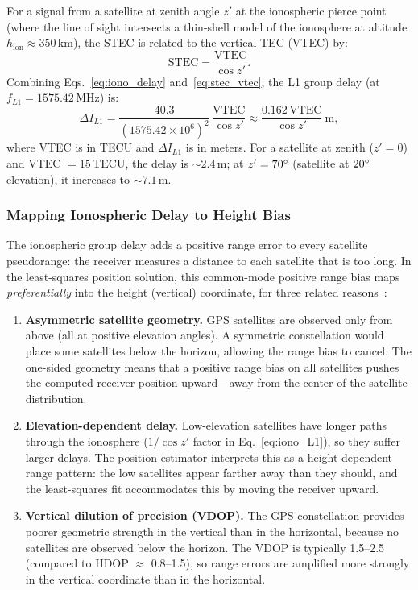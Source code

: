 For a signal from a satellite at zenith angle $z'$ at the ionospheric pierce point (where the line of sight intersects a thin-shell model of the ionosphere at altitude $h_{\text{ion}} \approx 350$\,km), the STEC is related to the vertical TEC (VTEC) by:
\begin{equation}
\text{STEC} = \frac{\text{VTEC}}{\cos z'}.
\label{eq:stec_vtec}
\end{equation}
Combining Eqs.~\eqref{eq:iono_delay} and~\eqref{eq:stec_vtec}, the L1 group delay (at $f_{L1} = 1575.42$\,MHz) is:
\begin{equation}
\Delta I_{L1} = \frac{40.3}{(1575.42 \times 10^6)^2}\,\frac{\text{VTEC}}{\cos z'} \approx \frac{0.162\,\text{VTEC}}{\cos z'}~\text{m},
\label{eq:iono_L1}
\end{equation}
where VTEC is in TECU and $\Delta I_{L1}$ is in meters. For a satellite at zenith ($z' = 0$) and VTEC $= 15$\,TECU, the delay is $\sim\!2.4$\,m; at $z' = 70^\circ$ (satellite at $20^\circ$ elevation), it increases to $\sim\!7.1$\,m.

\subsubsection{Mapping Ionospheric Delay to Height Bias}
\label{sec:iono_height}

The ionospheric group delay adds a positive range error to every satellite pseudorange: the receiver measures a distance to each satellite that is too long. In the least-squares position solution, this common-mode positive range bias maps \emph{preferentially} into the height (vertical) coordinate, for three related reasons~\cite{coster2008,ovstedal2002}:

\begin{enumerate}[nosep]
\item \textbf{Asymmetric satellite geometry.} GPS satellites are observed only from above (all at positive elevation angles). A symmetric constellation would place some satellites below the horizon, allowing the range bias to cancel. The one-sided geometry means that a positive range bias on all satellites pushes the computed receiver position upward---away from the center of the satellite distribution.

\item \textbf{Elevation-dependent delay.} Low-elevation satellites have longer paths through the ionosphere ($1/\cos z'$ factor in Eq.~\ref{eq:iono_L1}), so they suffer larger delays. The position estimator interprets this as a height-dependent range pattern: the low satellites appear farther away than they should, and the least-squares fit accommodates this by moving the receiver upward.

\item \textbf{Vertical dilution of precision (VDOP).} The GPS constellation provides poorer geometric strength in the vertical than in the horizontal, because no satellites are observed below the horizon. The VDOP is typically 1.5--2.5 (compared to HDOP $\approx$ 0.8--1.5), so range errors are amplified more strongly in the vertical coordinate than in the horizontal.
\end{enumerate}

